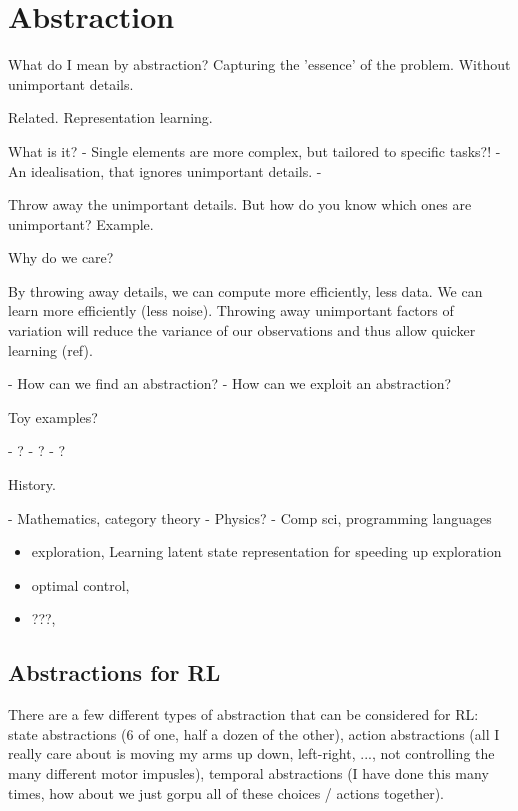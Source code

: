 \chapter{Abstraction}\label{C:abstraction}


What do I mean by abstraction?
Capturing the 'essence' of the problem. Without unimportant details.

Related. Representation learning.

What is it?
- Single elements are more complex, but tailored to specific tasks?!
- An idealisation, that ignores unimportant details.
-

Throw away the unimportant details. But how do you know which ones are unimportant?
Example.

Why do we care?

By throwing away details, we can compute more efficiently, less data.
We can learn more efficiently (less noise).
Throwing away unimportant factors of variation will reduce the variance of our
observations and thus allow quicker learning (ref).

- How can we find an abstraction?
- How can we exploit an abstraction?


Toy examples?

- ?
- ?
- ?

History.

- Mathematics, category theory
- Physics?
- Comp sci, programming languages



\begin{itemize}
\tightlist
\item
  exploration, Learning latent state representation for speeding up exploration \cite{Vezzani2019}
\item
  optimal control,
\item
  ???,
\end{itemize}

\section{Abstractions for RL}

There are a few different types of abstraction that can be considered for RL:
state abstractions (6 of one, half a dozen of the other), action abstractions (all I really care about is moving my
arms up down, left-right, ..., not controlling the many different motor impusles),
temporal abstractions (I have done this many times, how about we just gorpu all of these choices / actions together).

